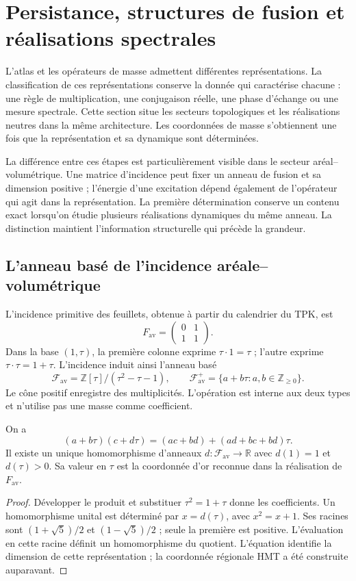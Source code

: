 \section{Persistance, structures de fusion et réalisations spectrales}
\label{vi:sec:topologia}

L’atlas et les opérateurs de masse admettent différentes représentations. La
classification de ces représentations conserve la donnée qui caractérise
chacune : une règle de multiplication, une conjugaison réelle, une phase
d’échange ou une mesure spectrale. Cette section situe les secteurs
topologiques et les réalisations neutres dans la même architecture.
Les coordonnées de masse s’obtiennent une fois que la représentation et sa
dynamique sont déterminées.

La différence entre ces étapes est particulièrement visible dans le secteur
aréal--volumétrique. Une matrice d’incidence peut fixer un anneau de fusion
et sa dimension positive ; l’énergie d’une excitation dépend également de
l’opérateur qui agit dans la représentation. La première détermination conserve
un contenu exact lorsqu’on étudie plusieurs réalisations dynamiques
du même anneau. La distinction maintient l’information structurelle qui
précède la grandeur.

\subsection{L’anneau basé de l’incidence aréale--volumétrique}
\label{vi:subsec:fusion-av}

L’incidence primitive des feuillets, obtenue à partir du calendrier du TPK, est
\[
 F_{\mathrm{av}}=\begin{pmatrix}0&1\\1&1\end{pmatrix}.
\]
Dans la base $(1,\tau)$, la première colonne exprime
$\tau\cdot1=\tau$ ; l’autre exprime $\tau\cdot\tau=1+\tau$.
L’incidence induit ainsi l’anneau basé
\[
 \mathcal F_{\mathrm{av}}=\mathbb Z[\tau]/(\tau^2-\tau-1),
 \qquad \mathcal F_{\mathrm{av}}^+
 =\{a+b\tau:a,b\in\mathbb Z_{\geq0}\}.
\]
Le cône positif enregistre des multiplicités. L’opération est interne aux
deux types et n’utilise pas une masse comme coefficient.

\begin{proposition}
\label{vi:prop:fusion-av}
On a
\[
 (a+b\tau)(c+d\tau)
 =(ac+bd)+(ad+bc+bd)\tau.
\]
Il existe un unique homomorphisme d’anneaux $d:\mathcal F_{\mathrm{av}}
\to\mathbb R$ avec $d(1)=1$ et $d(\tau)>0$. Sa valeur en $\tau$
est la coordonnée d’or reconnue dans la réalisation de $F_{\mathrm{av}}$.
\end{proposition}
\begin{proof}
Développer le produit et substituer $\tau^2=1+\tau$ donne les coefficients.
Un homomorphisme unital est déterminé par $x=d(\tau)$, avec
$x^2=x+1$. Ses racines sont $(1+\sqrt5)/2$ et $(1-\sqrt5)/2$ ;
seule la première est positive. L’évaluation en cette racine définit un
homomorphisme du quotient. L’équation identifie la dimension de cette
représentation ; la coordonnée régionale HMT a été construite auparavant.
\end{proof}

